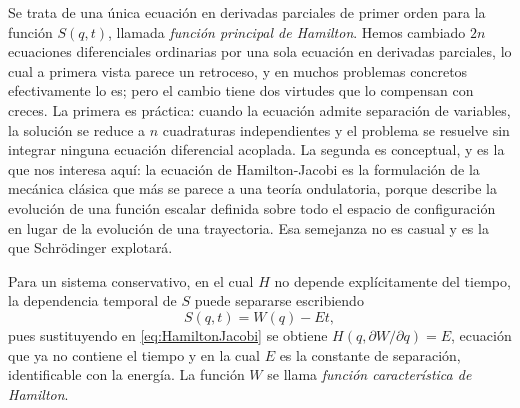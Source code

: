         Se trata de una única ecuación en derivadas parciales de primer orden para la función $S(q,t)$, llamada \textit{función principal de Hamilton}. Hemos cambiado $2n$ ecuaciones diferenciales ordinarias por una sola ecuación en derivadas parciales, lo cual a primera vista parece un retroceso, y en muchos problemas concretos efectivamente lo es; pero el cambio tiene dos virtudes que lo compensan con creces. La primera es práctica: cuando la ecuación admite separación de variables, la solución se reduce a $n$ cuadraturas independientes y el problema se resuelve sin integrar ninguna ecuación diferencial acoplada. La segunda es conceptual, y es la que nos interesa aquí: la ecuación de Hamilton-Jacobi es la formulación de la mecánica clásica que más se parece a una teoría ondulatoria, porque describe la evolución de una función escalar definida sobre todo el espacio de configuración en lugar de la evolución de una trayectoria. Esa semejanza no es casual y es la que Schrödinger explotará.

        Para un sistema conservativo, en el cual $H$ no depende explícitamente del tiempo, la dependencia temporal de $S$ puede separarse escribiendo
        \begin{equation}\label{eq:SeparacionTemporal}
            S(q,t) = W(q) - Et,
        \end{equation}
        pues sustituyendo en \eqref{eq:HamiltonJacobi} se obtiene $H(q,\partial W/\partial q) = E$, ecuación que ya no contiene el tiempo y en la cual $E$ es la constante de separación, identificable con la energía. La función $W$ se llama \textit{función característica de Hamilton}.

